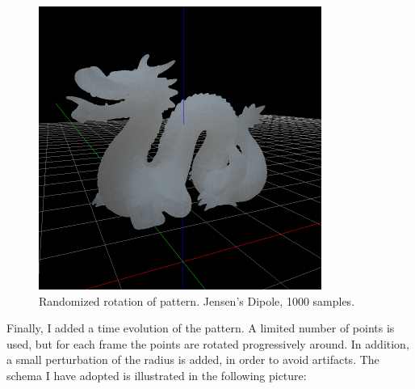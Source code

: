 \documentclass[12pt, twoside,a4paper]{article}
\begin{document}
\vspace{0.5cm}
\begin{figure}[!h]
\centering
\includegraphics[width=350px]{jensen_1000_onepass.png}
\caption{Randomized rotation of pattern. Jensen's Dipole, 1000 samples.}

\end{figure}

\clearpage
Finally, I added a time evolution of the pattern. A limited number of points is used, but for each frame the points are rotated progressively around. In addition, a small perturbation of the radius is added, in order to avoid artifacts. The schema I have adopted is illustrated in the following picture:
\end{document}
